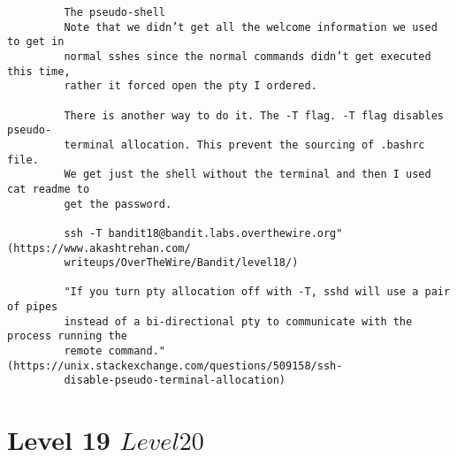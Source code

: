 \documentclass[a4paper]{report}
\begin{document}
\begin{verbatim}
		 The pseudo-shell
		 Note that we didn’t get all the welcome information we used to get in
		 normal sshes since the normal commands didn’t get executed this time, 
		 rather it forced open the pty I ordered.
		 
		 There is another way to do it. The -T flag. -T flag disables pseudo-
		 terminal allocation. This prevent the sourcing of .bashrc file. 
		 We get just the shell without the terminal and then I used cat readme to
		 get the password.
		 
		 ssh -T bandit18@bandit.labs.overthewire.org" (https://www.akashtrehan.com/
		 writeups/OverTheWire/Bandit/level18/)
		 
		 "If you turn pty allocation off with -T, sshd will use a pair of pipes 
		 instead of a bi-directional pty to communicate with the process running the 
		 remote command." (https://unix.stackexchange.com/questions/509158/ssh-
		 disable-pseudo-terminal-allocation)
\end{verbatim}


\section{Level 19 \rightarrow $ Level 20 $}
\end{document}
